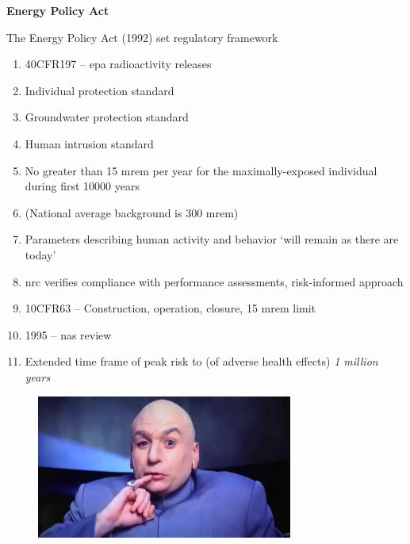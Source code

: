 \documentclass[aspectratio=1610,pdftex,dvipsnames,compress,xcolor={dvipsnames}]{beamer}
\newcommand{\acs}{\acrshort} %
\begin{document}
\begin{frame}[plain]{}
    \centering\LARGE\textbf{Energy Policy Act}
\end{frame}


\addtocounter{framenumber}{-1} 
\begin{frame}{The Energy Policy Act (1992) set regulatory framework}
    \begin{enumerate}[series=outerlist,topsep=0pt,itemsep=7pt,leftmargin=*,label=(\arabic*)]
        \item[]40CFR197 -- \acs{epa} radioactivity releases
        \item[]Individual protection standard   
        \item[]Groundwater protection standard   
        \item[]Human intrusion standard  
        \item[]No greater than 15 mrem per year for the maximally-exposed individual during first 10000 years
        \item[](National average background is 300 mrem)
        \item[]Parameters describing human activity and behavior `will remain as there are today'
        \item[]\acs{nrc} verifies compliance with performance assessments, risk-informed approach
        \item[]10CFR63 -- Construction, operation, closure, 15 mrem limit
        \item[]1995 -- \acs{nas} review
        \item[]Extended time frame of peak risk to (of adverse health effects) \textit{1 million years} 
    \end{enumerate}
\end{frame}


\begin{frame}{}
    \begin{figure}
        \centering
        \includegraphics[width=0.75\textwidth]{doctor.evil.jpg}
    \end{figure}
\end{frame}
\end{document}
